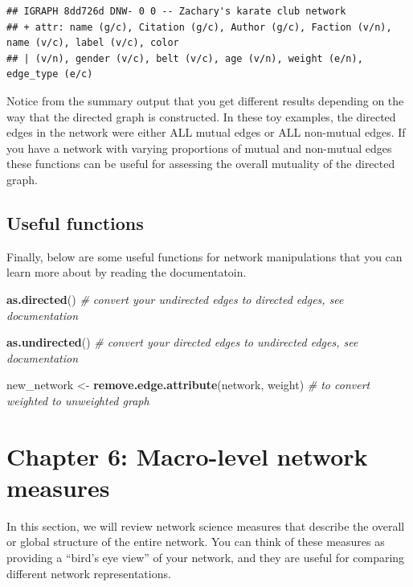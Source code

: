 \documentclass[
]{book}
\newenvironment{Shaded}{\begin{snugshade}}{\end{snugshade}}
\newcommand{\CommentTok}[1]{\textcolor[rgb]{0.56,0.35,0.01}{\textit{#1}}}
\newcommand{\FunctionTok}[1]{\textcolor[rgb]{0.13,0.29,0.53}{\textbf{#1}}}
\newcommand{\NormalTok}[1]{#1}
\newcommand{\OtherTok}[1]{\textcolor[rgb]{0.56,0.35,0.01}{#1}}
\newcommand{\StringTok}[1]{\textcolor[rgb]{0.31,0.60,0.02}{#1}}
\begin{document}
\begin{verbatim}
## IGRAPH 8dd726d DNW- 0 0 -- Zachary's karate club network
## + attr: name (g/c), Citation (g/c), Author (g/c), Faction (v/n), name (v/c), label (v/c), color
## | (v/n), gender (v/c), belt (v/c), age (v/n), weight (e/n), edge_type (e/c)
\end{verbatim}

Notice from the summary output that you get different results depending on the way that the directed graph is constructed. In these toy examples, the directed edges in the network were either ALL mutual edges or ALL non-mutual edges. If you have a network with varying proportions of mutual and non-mutual edges these functions can be useful for assessing the overall mutuality of the directed graph.

\section{Useful functions}\label{useful-functions}

Finally, below are some useful functions for network manipulations that you can learn more about by reading the documentatoin.

\begin{Shaded}
\begin{Highlighting}[]
\FunctionTok{as.directed}\NormalTok{() }\CommentTok{\# convert your undirected edges to directed edges, see documentation }

\FunctionTok{as.undirected}\NormalTok{() }\CommentTok{\# convert your directed edges to undirected edges, see documentation }

\NormalTok{new\_network }\OtherTok{\textless{}{-}} \FunctionTok{remove.edge.attribute}\NormalTok{(network, }\StringTok{\textquotesingle{}weight\textquotesingle{}}\NormalTok{) }\CommentTok{\# to convert weighted to unweighted graph }
\end{Highlighting}
\end{Shaded}

\chapter{Chapter 6: Macro-level network measures}\label{ch6}

In this section, we will review network science measures that describe the overall or global structure of the entire network. You can think of these measures as providing a ``bird's eye view'' of your network, and they are useful for comparing different network representations.
\end{document}
